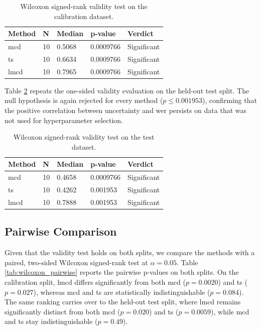\begin{table}[ht]
    \centering
    \begin{tabular}{|l|l|l|l|l|}
        \hline
        Method          & N  & Median & p-value   & Verdict     \\ \hline
        \acrshort{mcd}  & 10 & 0.5068 & 0.0009766 & Significant \\ \hline
        \acrshort{ts}   & 10 & 0.6634 & 0.0009766 & Significant \\ \hline
        \acrshort{lmcd} & 10 & 0.7965 & 0.0009766 & Significant \\ \hline
    \end{tabular}
    \caption{Wilcoxon signed-rank validity test on the calibration dataset.}
    \label{tab:wilcoxon_single_calibration}
\end{table}

Table \ref{tab:wilcoxon_single_test} repeats the one-sided validity evaluation on the held-out test split. The null hypothesis is again rejected for every method ($p \leq 0.001953$), confirming that the positive correlation between uncertainty and \acrshort{wer} persists on data that was not used for hyperparameter selection.

\begin{table}[ht]
    \centering
    \begin{tabular}{|l|l|l|l|l|}
        \hline
        Method          & N  & Median & p-value   & Verdict     \\ \hline
        \acrshort{mcd}  & 10 & 0.4658 & 0.0009766 & Significant \\ \hline
        \acrshort{ts}   & 10 & 0.4262 & 0.001953  & Significant \\ \hline
        \acrshort{lmcd} & 10 & 0.7888 & 0.001953  & Significant \\ \hline
    \end{tabular}
    \caption{Wilcoxon signed-rank validity test on the test dataset.}
    \label{tab:wilcoxon_single_test}
\end{table}

\subsection{Pairwise Comparison}

Given that the validity test holds on both splits, we compare the methods with a paired, two-sided Wilcoxon signed-rank test at $\alpha = 0.05$. Table \ref{tab:wilcoxon_pairwise} reports the pairwise p-values on both splits. On the calibration split, \acrshort{lmcd} differs significantly from both \acrshort{mcd} ($p = 0.0020$) and \acrshort{ts} ($p = 0.027$), whereas \acrshort{mcd} and \acrshort{ts} are statistically indistinguishable ($p = 0.084$). The same ranking carries over to the held-out test split, where \acrshort{lmcd} remains significantly distinct from both \acrshort{mcd} ($p = 0.020$) and \acrshort{ts} ($p = 0.0059$), while \acrshort{mcd} and \acrshort{ts} stay indistinguishable ($p = 0.49$).

